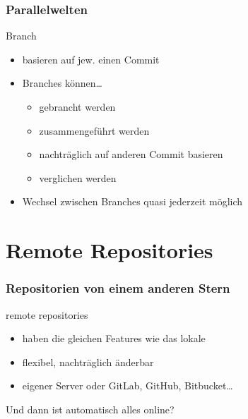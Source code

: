 \documentclass{beamer}
\begin{document}
\begin{frame}
	\frametitle{Parallelwelten}
	\begin{block}{Branch}
		\begin{itemize}
			\item basieren auf jew. einen Commit
				\pause
			\item Branches können…
				\begin{itemize}
					\item gebrancht werden
					\item zusammengeführt werden
					\item nachträglich auf anderen Commit basieren
					\item verglichen werden
				\end{itemize}
				\pause
			\item Wechsel zwischen Branches quasi jederzeit möglich
		\end{itemize}
	\end{block}
\end{frame}

\section{Remote Repositories}

\begin{frame}
\end{frame}

\begin{frame}
	\frametitle{Repositorien von einem anderen Stern}
	\begin{block}{remote repositories}
		\begin{itemize}
			\item haben die gleichen Features wie das lokale
			\item flexibel, nachträglich änderbar
			\item eigener Server oder GitLab, GitHub, Bitbucket…
		\end{itemize}
	\end{block}
\end{frame}

\begin{frame}
	\begin{center}
		Und dann ist automatisch alles online?
		\pause
	\end{center}
\end{frame}
\end{document}
